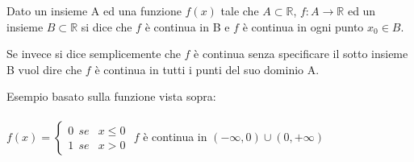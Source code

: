 \begin{definition}
    Dato un insieme A ed una funzione $f(x)$ tale che $A \subset \mathbb{R}$, $f: A \longrightarrow \mathbb{R}$ ed un insieme $B \subset \mathbb{R}$ si dice che $f$ è continua in B e $f$ è continua in ogni punto $x_0 \in B$.
\end{definition}
Se invece si dice semplicemente che $f$ è continua senza specificare il sotto insieme B vuol dire che $f$ è continua in tutti i punti del suo dominio A.
\begin{example}
    Esempio basato sulla funzione vista sopra:\\\\
    $
      f(x)=\begin{cases}
        0 \: \: se & x \leq 0\\
        1 \: \: se & x > 0
      \end{cases}
    $ \hspace{1cm}
    $f$ è continua in $(-\infty, 0) \cup (0, +\infty)$ 
\end{example}

